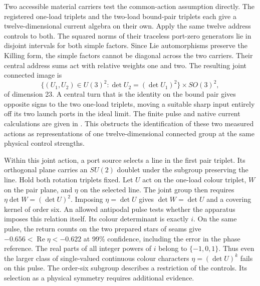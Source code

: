 \documentclass[11pt]{article}
\begin{document}
Two accessible material carriers test the common-action assumption
directly. The registered one-load triplets and the two-load bound-pair
triplets each give a twelve-dimensional current algebra on their own.
Apply the same twelve address controls to both. The squared norms of
their traceless port-zero generators lie in disjoint intervals for
both simple factors. Since Lie automorphisms preserve the Killing form,
the simple factors cannot be diagonal across the two carriers.
Their central address sums act with relative weights one and two.
The resulting joint connected image is
\[
 \{(U_1,U_2)\in U(3)^2:\det U_2=(\det U_1)^2\}\times SO(3)^2,
\]
of dimension 23. A central turn that is the identity on the bound pair
gives opposite signs to the two one-load triplets, moving a suitable
sharp input entirely off its two launch ports in the ideal limit.
The finite pulse and native current calculations are given in
.
This obstructs the identification of these two measured actions
as representations of one twelve-dimensional connected group at the
same physical control strengths.

Within this joint action, a port source selects a line in the first
pair triplet. Its orthogonal plane carries an \(SU(2)\) doublet under
the subgroup preserving the line. Hold both rotation triplets fixed.
Let \(U\) act on the one-load colour triplet, \(W\) on the pair plane,
and \(\eta\) on the selected line. The joint group then requires
\(\eta\det W=(\det U)^2\). Imposing \(\eta=\det U\) gives
\(\det W=\det U\) and a covering kernel of order six. An allowed
antipodal pulse tests whether the apparatus imposes this relation
itself. Its colour determinant is exactly \(i\). On the same pulse,
the return counts on the two prepared stars of seams give
\(-0.656<\operatorname{Re}\eta<-0.622\) at 99\% confidence, including
the error in the phase reference. The real parts of all integer powers
of \(i\) belong to \(\{-1,0,1\}\). Thus even the larger class of
single-valued continuous colour characters \(\eta=(\det U)^k\) fails
on this pulse. The order-six subgroup describes a restriction of the
controls. Its selection as a physical symmetry requires additional evidence.
\end{document}
